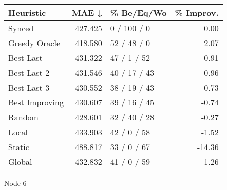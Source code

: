 \begin{tabular}{lrlr}
\toprule
\textbf{Heuristic} & \textbf{MAE ↓} & \textbf{\% Be/Eq/Wo} & \textbf{\% Improv.} \\
\midrule
            Synced &        427.425 &          0 / 100 / 0 &                0.00 \\
     Greedy Oracle &        418.580 &          52 / 48 / 0 &                2.07 \\
         Best Last &        431.322 &          47 / 1 / 52 &               -0.91 \\
       Best Last 2 &        431.546 &         40 / 17 / 43 &               -0.96 \\
       Best Last 3 &        430.552 &         38 / 19 / 43 &               -0.73 \\
    Best Improving &        430.607 &         39 / 16 / 45 &               -0.74 \\
            Random &        428.601 &         32 / 40 / 28 &               -0.27 \\
             Local &        433.903 &          42 / 0 / 58 &               -1.52 \\
            Static &        488.817 &          33 / 0 / 67 &              -14.36 \\
            Global &        432.832 &          41 / 0 / 59 &               -1.26 \\
\bottomrule
\end{tabular}
\caption{Node 6}
\label{tab:non_lr05_le2_bs2_6}
